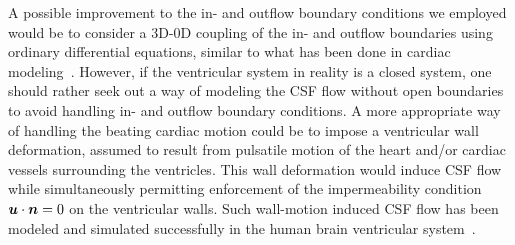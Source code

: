 \documentclass{WileyMSP-template}
\begin{document}
A possible improvement to the in- and outflow boundary conditions we employed would be
to consider a 3D-0D coupling of the in- and outflow boundaries using
ordinary differential equations,
similar to what has been done in cardiac
modeling~\cite{Brown2024AMechanics, Augustin2021ACirculation}.
However, if the ventricular system in reality is a closed system,
one should rather seek out a way of modeling the CSF flow without open boundaries to avoid
handling in- and outflow boundary conditions. A more appropriate way of handling the beating
cardiac motion could be to impose a ventricular wall deformation, assumed to result from pulsatile
motion of the heart and/or cardiac vessels surrounding the ventricles. This wall deformation would
induce CSF flow while simultaneously permitting enforcement of the impermeability condition
$\bm{u}\cdot\bm{n}=0$ on the ventricular walls. Such wall-motion induced CSF flow has been modeled and
simulated successfully in the human brain ventricular system~\cite{Causemann2022HumanFramework,
Kurtcuoglu2005ComputationalSystem, Kurtcuoglu2007ComputationalSylvius, Linninger2005PulsatileBrain}.
\end{document}

